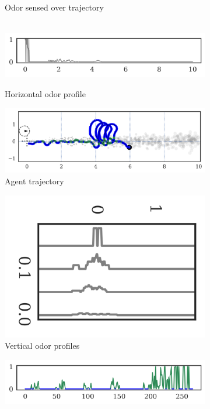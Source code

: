 \documentclass[5p,twocolumn,authoryear]{elsarticle}
\begin{document}
\begin{figure}[h!]
\begin{subfigure}{0.40\textwidth}
    \caption{Odor sensed over trajectory} \\
    \includegraphics[width=\textwidth]{output_16_18.png}
    \caption{Horizontal odor profile}
\end{subfigure}%
\caption{Wind direction switches many times}
\begin{subfigure}{0.43\textwidth}
    \centering
    \includegraphics[width=\textwidth]{output_16_22}
    \caption{Agent trajectory}
\end{subfigure}%
\begin{subfigure}{0.15\textwidth}
    \centering
    \includegraphics[width=\textwidth,angle=90,origin=c]{output_16_24.png}
    \caption{Vertical odor profiles}
    \label{fig:second}
\end{subfigure}%
\begin{subfigure}{0.40\textwidth}
    \includegraphics[width=\textwidth]{output_16_27.png} 

\end{subfigure}
\end{figure}
\end{document}
